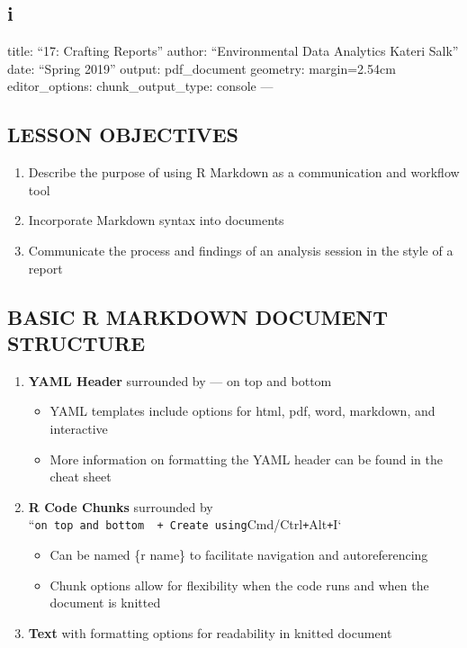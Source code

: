 \documentclass[
]{article}
\author{}
\date{\vspace{-2.5em}}
\providecommand{\tightlist}{%
  \setlength{\itemsep}{0pt}\setlength{\parskip}{0pt}}
\begin{document}
\hypertarget{i}{%
\subsection{i}\label{i}}

title: ``17: Crafting Reports'' author: ``Environmental Data Analytics
\textbar{} Kateri Salk'' date: ``Spring 2019'' output: pdf\_document
geometry: margin=2.54cm editor\_options: chunk\_output\_type: console
---

\hypertarget{lesson-objectives}{%
\subsection{LESSON OBJECTIVES}\label{lesson-objectives}}

\begin{enumerate}
\def\labelenumi{\arabic{enumi}.}
\tightlist
\item
  Describe the purpose of using R Markdown as a communication and
  workflow tool
\item
  Incorporate Markdown syntax into documents
\item
  Communicate the process and findings of an analysis session in the
  style of a report
\end{enumerate}

\hypertarget{basic-r-markdown-document-structure}{%
\subsection{BASIC R MARKDOWN DOCUMENT
STRUCTURE}\label{basic-r-markdown-document-structure}}

\begin{enumerate}
\def\labelenumi{\arabic{enumi}.}
\tightlist
\item
  \textbf{YAML Header} surrounded by --- on top and bottom

  \begin{itemize}
  \tightlist
  \item
    YAML templates include options for html, pdf, word, markdown, and
    interactive
  \item
    More information on formatting the YAML header can be found in the
    cheat sheet
  \end{itemize}
\item
  \textbf{R Code Chunks} surrounded by
  ``\texttt{on\ top\ and\ bottom\ \ +\ Create\ using}Cmd/Ctrl\texttt{+}Alt\texttt{+}I`

  \begin{itemize}
  \tightlist
  \item
    Can be named \{r name\} to facilitate navigation and autoreferencing
  \item
    Chunk options allow for flexibility when the code runs and when the
    document is knitted
  \end{itemize}
\item
  \textbf{Text} with formatting options for readability in knitted
  document
\end{enumerate}
\end{document}
